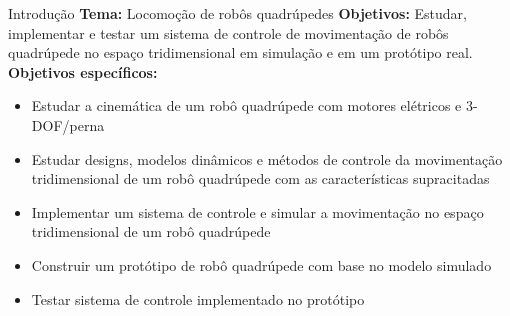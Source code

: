 \begin{frame}[t]{Introdução}
    \textbf{Tema:} Locomoção de robôs quadrúpedes
    \textbf{Objetivos:} Estudar, implementar e testar um sistema de controle de movimentação de
    robôs quadrúpede no espaço tridimensional em simulação e em um protótipo real.
    \textbf{Objetivos específicos:}
    \begin{itemize}
        \item Estudar a cinemática de um robô quadrúpede com motores elétricos e 3-DOF/perna
        \item Estudar designs, modelos dinâmicos e métodos de controle da movimentação
        tridimensional de um robô quadrúpede com as características supracitadas
        \item Implementar um sistema de controle e simular a movimentação no espaço
        tridimensional de um robô quadrúpede
        \item Construir um protótipo de robô quadrúpede com base no modelo simulado
        \item Testar sistema de controle implementado no protótipo
        
    \end{itemize}
\end{frame}
